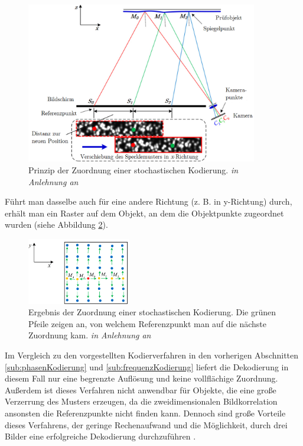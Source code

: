 \begin{figure}[H]
	\centering
	\includegraphics[width=0.9\textwidth]{02_grundlagenDerDeflektometrie/rekonstruktion/stochastischeKodierung/figures/Prinzip}
	\caption[Prinzip der Zuordnung einer stochastischen Kodierung]{Prinzip der Zuordnung einer stochastischen Kodierung. \textit{in Anlehnung an} \cite{specklePattern}}
	\label{img:prinzipStoKodierung}
\end{figure}
%
\noindent
Führt man dasselbe auch für eine andere Richtung (z. B. in y-Richtung) durch, erhält man ein Raster auf dem Objekt, an dem die Objektpunkte zugeordnet wurden (siehe Abbildung \ref{img:ergebnisStoKodierung}).
%
\begin{figure}[H]
	\centering
	\includegraphics[width=0.4\textwidth]{02_grundlagenDerDeflektometrie/rekonstruktion/stochastischeKodierung/figures/Ergebnis}
	\caption[Ergebnis der Zuordnung einer stochastischen Kodierung]{Ergebnis der Zuordnung einer stochastischen Kodierung. Die grünen Pfeile zeigen an, von welchem Referenzpunkt man auf die nächste Zuordnung kam. \textit{in Anlehnung an} \cite{specklePattern}}
	\label{img:ergebnisStoKodierung}
\end{figure}
%
\noindent
Im Vergleich zu den vorgestellten Kodierverfahren in den vorherigen Abschnitten \ref{sub:phasenKodierung} und \ref{sub:frequenzKodierung} liefert die Dekodierung in diesem Fall nur eine begrenzte Auflösung und keine vollflächige Zuordnung.
Außerdem ist dieses Verfahren nicht anwendbar für Objekte, die eine große Verzerrung des Musters erzeugen, da die zweidimensionalen Bildkorrelation ansonsten die Referenzpunkte nicht finden kann.
Dennoch sind große Vorteile dieses Verfahrens, der geringe Rechenaufwand und die Möglichkeit, durch drei Bilder eine erfolgreiche Dekodierung durchzuführen \cite{specklePattern}.